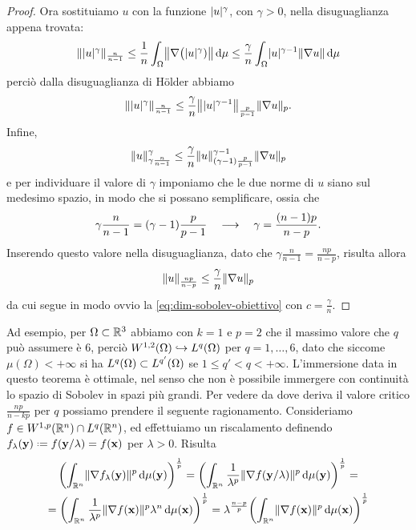 \begin{proof}
    Ora sostituiamo $u$ con la funzione $\abs{u}^\gamma$, con $\gamma>0$, nella disuguaglianza appena trovata:
    \begin{equation}
        \norm{\abs{u}^\gamma}_\frac{n}{n-1}\le
        \frac1{n}\int_\Omega\norm[\big]{\grad\big(\abs{u}^\gamma)}\,\dd\mu\le
        \frac{\gamma}{n}\int_\Omega\abs{u}^{\gamma-1}\norm{\grad u}\,\dd\mu
    \end{equation}
    perciò dalla disuguaglianza di Hölder abbiamo
    \begin{equation}
        \norm{\abs{u}^\gamma}_\frac{n}{n-1}\le
        \frac{\gamma}{n}\norm[\big]{\abs{u}^{\gamma-1}}_\frac{p}{p-1}\norm{\grad u}_p.
    \end{equation}
    Infine,
    \begin{equation}
        \norm{u}_{\gamma\frac{n}{n-1}}^\gamma\le
        \frac{\gamma}{n}\norm{u}^{\gamma-1}_{(\gamma-1)\frac{p}{p-1}}\norm{\grad u}_p
    \end{equation}
    e per individuare il valore di $\gamma$ imponiamo che le due norme di $u$ siano sul medesimo spazio, in modo che si possano semplificare, ossia che
    \begin{equation}
        \gamma\frac{n}{n-1}=(\gamma-1)\frac{p}{p-1}
        \qqq
        \gamma=\frac{(n-1)p}{n-p}.
    \end{equation}
    Inserendo questo valore nella disuguaglianza, dato che $\gamma\frac{n}{n-1}=\frac{np}{n-p}$, risulta allora
    \begin{equation}
        \norm{u}_\frac{np}{n-p}\le\frac{\gamma}{n}\norm{\grad u}_p
    \end{equation}
    da cui segue in modo ovvio la \eqref{eq:dim-sobolev-obiettivo} con $c=\frac{\gamma}{n}$.
\end{proof}
Ad esempio, per $\Omega\subset\R^3$ abbiamo con $k=1$ e $p=2$ che il massimo valore che $q$ può assumere è $6$, perciò $\sobW[1,2]{\Omega}\emb\leb[q]{\Omega}$ per $q=1,\dotsc,6$, dato che siccome $\mu(\Omega)<+\infty$ si ha $\leb[q]{\Omega}\subset\leb[q']{\Omega}$ se $1\le q'<q<+\infty$.
L'immersione data in questo teorema è ottimale, nel senso che non è possibile immergere con continuità lo spazio di Sobolev in spazi più grandi.
Per vedere da dove deriva il valore critico $\frac{np}{n-kp}$ per $q$ possiamo prendere il seguente ragionamento.
Consideriamo $f\in\sobW[1,p]{\R^n}\cap\leb[q]{\R^n}$, ed effettuiamo un riscalamento definendo $f_\lambda(\vec y)\defeq f(\vec y/\lambda)=f(\vec x)$ per $\lambda>0$.
Risulta
\begin{multline}
    \biggl(\int_{\R^n}\norm{\grad f_\lambda(\vec y)}^p\,\dd\mu(\vec y)\biggr)^\frac1{p}=
    \biggl(\int_{\R^n}\frac1{\lambda^p}\norm{\grad f(\vec y/\lambda)}^p\,\dd\mu(\vec y)\biggr)^\frac1{p}=\\=
    \biggl(\int_{\R^n}\frac1{\lambda^p}\norm{\grad f(\vec x)}^p\lambda^n\,\dd\mu(\vec x)\biggr)^\frac1{p}=
    \lambda^\frac{n-p}{p}\biggl(\int_{\R^n}\norm{\grad f(\vec x)}^p\,\dd\mu(\vec x)\biggr)^\frac1{p}
\end{multline}
